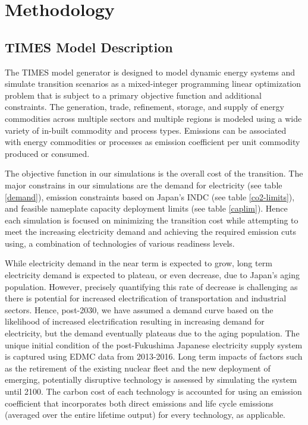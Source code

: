 \section{Methodology} \label{method}
\subsection{TIMES Model Description}
The \gls{TIMES} model generator is designed to model dynamic energy systems and simulate transition scenarios as a mixed-integer programming linear optimization problem that is subject to a primary objective function and additional constraints. The generation, trade, refinement, storage, and supply of energy commodities across multiple sectors and multiple regions is modeled using a wide variety of in-built commodity and process types. Emissions can be associated with energy commodities or processes as emission coefficient per unit commodity produced or consumed. 

The objective function in our simulations is the overall cost of the transition. The major constrains in our simulations are the demand for electricity (see table \ref{demand}), emission constraints based on Japan's \gls{INDC} (see table \ref{co2-limits}), and feasible nameplate capacity deployment limits (see table \ref{caplim}). Hence each simulation is focused on minimizing the transition cost while attempting to meet the increasing electricity demand and achieving the required emission cuts using, a combination of technologies of various readiness levels. 

While electricity demand in the near term is expected to grow, long term electricity demand is expected to plateau, or even decrease, due to Japan's aging population. However, precisely quantifying this rate of decrease is challenging as there is potential for increased electrification of  transportation and industrial sectors. Hence, post-2030, we have assumed a demand curve based on the likelihood of increased electrification resulting in increasing demand for electricity, but the demand eventually plateaus due to the aging population. The unique initial condition of the post-Fukushima Japanese electricity supply system is captured using \gls{EDMC} data from 2013-2016. Long term impacts of factors such as the retirement of the existing nuclear fleet and the new deployment of emerging, potentially disruptive technology is assessed by simulating the system until 2100. The carbon cost of each technology is accounted for using an emission coefficient that incorporates both direct emissions and life cycle emissions (averaged over the entire lifetime output) for every technology, as applicable.


